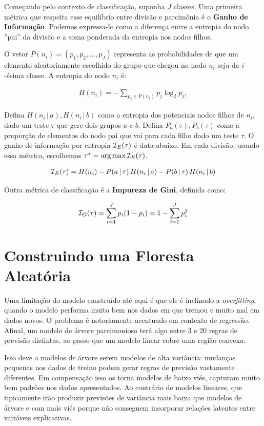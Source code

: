 Começando pelo contexto de classificação, suponha $J$ classes. Uma primeira métrica que respeita esse equilíbrio entre divisão e parcimônia é o \textbf{Ganho de Informação}. Podemos expressa-lo como a diferença entre a entropia do nodo ''pai'' da divisão e a soma ponderada da entropia nos nodos filhos. 

O vetor $P(n_i) = (p_1, p_2, ..., p_J)$ representa as probabilidades de que um elemento aleatoriamente escolhido do grupo que chegou no nodo $n_i$ seja da $i$-ésima classe. A entropia do nodo $n_i$ é:

\begin{align}
    H(n_i) = - \sum_{p_j \in P(n_i)} p_j \log_2 p_j, 
\end{align}

Defina $H(n_i \, | \, a), H(n_i \, |\,  b)$ como a entropia dos potenciais nodos filhos de $n_i$, dado um teste $\tau$ que gere dois grupos $a$ e $b$. Defina $P_a(\tau), P_b(\tau)$ como a proporção de elementos do nodo pai que vai para cada filho dado um teste $\tau$. O ganho de informação por entropia $\mathcal{I}_E(\tau)$ é data abaixo. Em cada divisão, usando essa métrica, escolhemos $\tau^* = \operatorname*{arg\,max}{\mathcal{I}_E(\tau)}$.

\begin{align}
    \mathcal{I}_E(\tau) = H(n_i) - P(a\, |\, \tau) \,H(n_i \, |\,  a) - P(b \,| \,\tau)\, H(n_i \, |\,  b)
\end{align}

 Outra métrica de classificação é a \textbf{Impureza de Gini}, definida como:
 
 \begin{align}
     \mathcal{I}_G(\tau) = \sum_{i = 1}^J p_i ( 1  - p_i) =  1 - \sum_{i = 1}^J p_i^2
 \end{align}



 \section{Construindo uma Floresta Aleatória}
 

Uma limitação do modelo construído até aqui é que ele é inclinado a \textit{overfitting}, quando o modelo performa muito bem nos dados em que treinou e muito mal em dados novos. O problema é notoriamente acentuado em contexto de regressão. Afinal, um modelo de árvore parcimonioso terá algo entre 3 e 20 regras de previsão distintas, ao passo que um modelo linear cobre uma região convexa. 

Isso deve a modelos de árvore serem modelos de alta variância: mudanças pequenas nos dados de treino podem gerar regras de previsão vastamente diferentes. Em compensação isso os torna modelos de baixo viés, capturam muito bem padrões nos dados apresentados. Ao contrário de modelos lineares, que tipicamente irão produzir previsões de variância mais baixa que modelos de árvore e com mais viés porque não conseguem incorporar relações latentes entre variáveis explicativas. 

